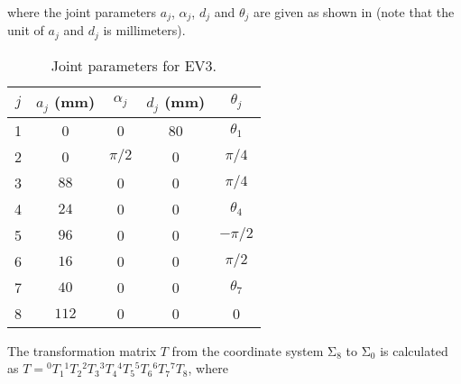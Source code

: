 \documentclass{birkjour}
\theoremstyle{plain}
\theoremstyle{definition}
\newcommand{\rmSigma}{\mathrm{\Sigma}}
\begin{document}
    where the joint parameters $a_j$, $\alpha_j$, $d_j$ and $\theta_j$ 
    are given as shown in  (note that the unit
    of $a_j$ and $d_j$ is millimeters).
    \begin{table}[t]
        \caption{Joint parameters for EV3.}
        \label{tab:ev3-parameters}
        \begin{center}
        \begin{tabular}{c|cccc}
                $j$ & $a_j$ (mm) & $\alpha_j$ & $d_j$ (mm) & $\theta_j$  \\ 
                \hline
                1 & 0 & 0 & 80 & $\theta_1 $ \\
                2 & 0 & $\pi/2$ & 0 & $\pi/4$ \\
                3 & ${88}$ & 0 & 0 &$\pi/4 $ \\
                4 & ${24} $ & 0 & 0 & $\theta_4$\\
                5 & ${96} $ & 0 & 0 & $-\pi/2$ \\
                6 & ${16}$ & 0 & 0 & $\pi/2$\\
                7 & ${40} $ & 0 & 0 &  $\theta_7$\\  
                8 & ${112} $ & 0 & 0 &0  \\
                \hline
        \end{tabular}
        \end{center}
    \end{table}
    The transformation matrix $T$ 
    from the coordinate system $\rmSigma_8$ to $\rmSigma_0$
    is calculated as 
    $T={}^{0}T_1{}^{1}T_2{}^{2}T_3{}^{3}T_4{}^{4}T_5{}^{5}T_6{}^{6}T_7{}^{7}T_8$,
    where 
\end{document}
